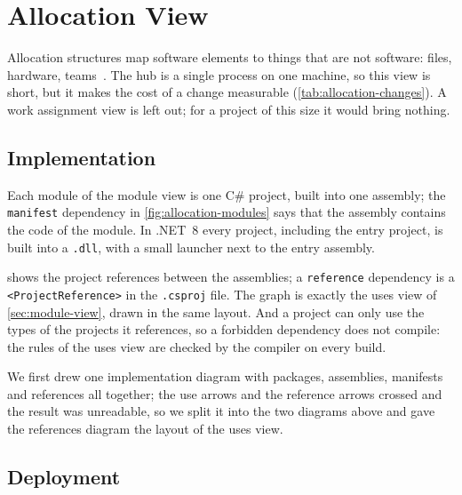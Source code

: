 \documentclass[../main-en.tex]{subfiles}
\begin{document}
\section{Allocation View}
\label{sec:allocation-view}

Allocation structures map software elements to things that are not software:
files, hardware, teams~\cite{bass_software_2021}. The hub is a single
process on one machine, so this view is short, but it makes the cost of a
change measurable (\cref{tab:allocation-changes}). A work
assignment view is left out; for a project of this size it would bring
nothing.

\subsection{Implementation}

Each module of the module view is one C\# project, built into one assembly;
the \texttt{manifest} dependency in \cref{fig:allocation-modules} says that
the assembly contains the code of the module. In .NET~8 every project,
including the entry project, is built into a \texttt{.dll}, with a small
launcher next to the entry assembly.


 shows the project references between the
assemblies; a \texttt{reference} dependency is a \texttt{<ProjectReference>}
in the \texttt{.csproj} file. The graph is exactly the uses view of
\cref{sec:module-view}, drawn in the same layout. And a project can only
use the types of the projects it references, so a forbidden dependency does
not compile: the rules of the uses view are checked by the compiler on
every build.


We first drew one implementation diagram with packages, assemblies,
manifests and references all together; the use arrows and the reference
arrows crossed and the result was unreadable, so we split it into the two
diagrams above and gave the references diagram the layout of the uses view.

\subsection{Deployment}
\end{document}
